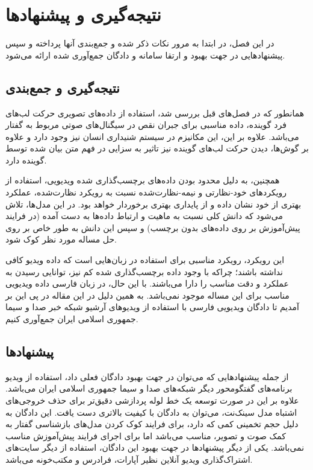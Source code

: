 \chapter{نتیجه‌گیری و پیشنهاد‌ها}

در این فصل، در ابتدا به مرور نکات ذکر شده و جمع‌بندی آنها پرداخته و سپس پیشنهاد‌هایی در جهت بهبود و ارتقا سامانه و دادگان جمع‌آوری شده ارائه می‌شود.

\section{نتیجه‌گیری و جمع‌بندی}

همانطور که در فصل‌های قبل بررسی شد، استفاده از داده‌های تصویری حرکت لب‌های فرد گوینده، داده مناسبی برای جبران نقص در سیگنال‌های صوتی مربوط به گفتار می‌باشد. علاوه بر این، این مکانیزم در سیستم شنیداری انسان نیز وجود دارد و علاوه بر گوش‌ها، دیدن حرکت لب‌های گوینده نیز تاثیر به سزایی در فهم متن بیان شده توسط گوینده دارد.

همچنین، به دلیل محدود بودن داده‌های برچسب‌گذاری شده ویدیویی، استفاده از رویکرد‌های خود-نظارتی و نیمه-نظارت‌شده نسبت به رویکرد نظارت‌شده، عملکرد بهتری از خود نشان داده و از پایداری بهتری برخوردار خواهد بود. در این مدل‌ها، تلاش می‌شود که دانش کلی نسبت به ماهیت و ارتباط داده‌ها به دست آمده (در فرایند پیش‌آموزش بر روی داده‌های بدون برچسب) و سپس این دانش به طور خاص بر روی حل مساله مورد نظر کوک شود.

این رویکرد، رویکرد مناسبی برای استفاده در زبان‌هایی است که داده ویدیو کافی نداشته باشند؛ چراکه با وجود داده برچسب‌گذاری شده کم نیز، توانایی رسیدن به عملکرد و دقت مناسب را دارا می‌باشند. با این حال، در زبان فارسی داده ویدیویی مناسب برای این مساله موجود نمی‌باشد. به همین دلیل در این مقاله در پی این بر آمدیم تا دادگان ویدیویی فارسی با استفاده از ویدیو‌های آرشیو شبکه خبر صدا و سیما جمهوری اسلامی ایران جمع‌آوری کنیم.


\section{پیشنهاد‌ها}

از جمله پیشنهاد‌هایی که می‌توان در جهت بهبود دادگان فعلی داد، استفاده از ویدیو برنامه‌های گفتگومحور دیگر شبکه‌های صدا و سیما جمهوری اسلامی ایران می‌باشد. علاوه بر این در صورت توسعه یک خط لوله پردازشی دقیق‌تر برای حذف خروجی‌های اشتباه مدل سینک‌نت، می‌توان به دادگان با کیفیت بالاتری دست یافت. این دادگان به دلیل حجم تخمینی کمی که دارد، برای فرایند کوک کردن مدل‌های بازشناسی گفتار به کمک صوت و تصویر، مناسب می‌باشد اما برای اجرای فرایند پیش‌آموزش مناسب نمی‌باشد. یکی از دیگر پیشنهاد‌ها در جهت بهبود این دادگان، استفاده از دیگر سایت‌های اشتراک‌گذاری ویدیو آنلاین نظیر آپارات، فرادرس و مکتب‌خونه می‌باشد.

